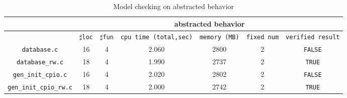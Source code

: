 \begin{table}
  \scriptsize
\begin{tabular}{|c|c|c|c|c|c|c|}
\hline
&\multicolumn{6}{|c|}{abstracted behavior} \\
\hline
 &$\sharp$\texttt{loc} & $\sharp$\texttt{fun} & \texttt{cpu time (total,sec)} & \texttt{memory (MB)} & \texttt{fixed num} & \texttt{verified result} \\
\hline
\texttt{database.c} &  16 & 4 & 2.060 & 2800 & 2 & \texttt{FALSE} \\
\hline
\texttt{database\_rw.c} &  18 & 4 & 1.990 & 2737 & 2 & \texttt{TRUE} \\
\hline
\texttt{gen\_init\_cpio.c} & 16 & 4 & 2.020 & 2802 & 2  & \texttt{FALSE}  \\
\hline
\texttt{gen\_init\_cpio\_rw.c} & 18 & 4 & 2.000  & 2742  & 2  & \texttt{TRUE}  \\

\hline
\end{tabular}
\caption{Model checking on abstracted behavior}
\label{tb:mca}
\end{table}


